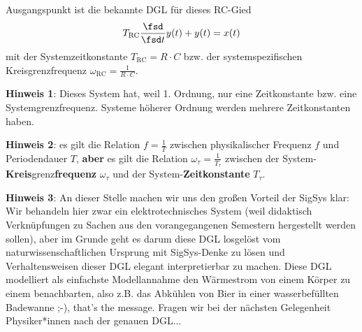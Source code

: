 \begin{Ansatz}
Ausgangspunkt ist die bekannte DGL für dieses RC-Gied
\begin{align}
T_\mathrm{RC}\frac{\fsd}{\fsd t} y(t) + y(t) = x(t)
\end{align}
mit der Systemzeitkonstante $T_\mathrm{RC}=R \cdot C$ bzw. der systemspezifischen
Kreisgrenzfrequenz $\omega_\mathrm{RC}=\frac{1}{R \cdot C}$.
%

\noindent\textbf{Hinweis 1}: Dieses System hat, weil 1. Ordnung, nur eine
Zeitkonstante bzw. eine Systemgrenzfrequenz.
Systeme höherer Ordnung werden mehrere Zeitkonstanten haben.

\noindent\textbf{Hinweis 2}: es gilt die
Relation $f=\frac{1}{T}$ zwischen physikalischer Frequenz $f$ und Periodendauer $T$, \textbf{aber}
es gilt die Relation $\omega_\tau = \frac{1}{T_\tau}$ zwischen der System-\textbf{Kreis}grenz\textbf{frequenz}
$\omega_\tau $ und der System-\textbf{Zeitkonstante} $T_\tau $.

\noindent \textbf{Hinweis 3}:
An dieser Stelle machen wir uns den großen Vorteil der SigSys klar:
%
Wir behandeln hier zwar ein elektrotechnisches System (weil didaktisch
Verknüpfungen zu Sachen aus den vorangegangenen Semestern hergestellt werden
sollen), aber im Grunde geht es darum diese DGL losgelöst vom naturwissenschaftlichen
Ursprung mit SigSys-Denke zu lösen und Verhaltensweisen dieser DGL elegant
interpretierbar zu machen.
%
Diese DGL modelliert als einfachste Modellannahme den Wärmestrom von einem Körper
zu einem benachbarten, also z.B. das Abkühlen von Bier in einer wasserbefüllten
Badewanne ;-), that's the message. Fragen wir bei der nächsten
Gelegenheit Physiker*innen nach der genauen DGL...
\end{Ansatz}

